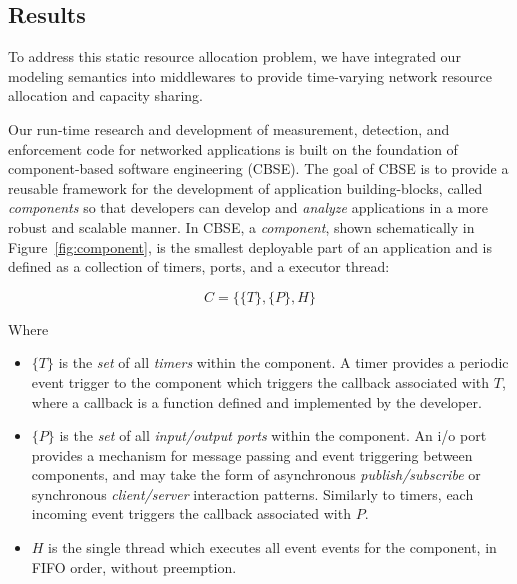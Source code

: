 \subsection{Results}
To address this static resource allocation problem, we have integrated
our modeling semantics into middlewares to provide time-varying
network resource allocation and capacity sharing.

Our run-time research and development of measurement, detection, and
enforcement code for networked applications is built on the foundation
of component-based software engineering (CBSE).  The goal of CBSE is
to provide a reusable framework for the development of application
building-blocks, called \emph{components} so that developers can develop
and \emph{analyze} applications in a more robust and scalable manner.  In
CBSE, a \emph{component}, shown schematically in
Figure~\ref{fig:component}, is the smallest deployable part of an
application and is defined as a collection of timers, ports, and a
executor thread:

\begin{equation}
  C = \{\{T\},\{P\},H\}
\end{equation}

Where

\begin{itemize}
\item $\{T\}$ is the \emph{set} of all \emph{timers} within the component.  A
  timer provides a periodic event trigger to the component which
  triggers the callback associated with $T$, where a callback is a
  function defined and implemented by the developer.  
\item $\{P\}$ is the \emph{set} of all \emph{input/output ports} within the
  component.  An i/o port provides a mechanism for message passing and
  event triggering between components, and may take the form of
  asynchronous \emph{publish/subscribe} or synchronous \emph{client/server}
  interaction patterns.  Similarly to timers, each incoming event
  triggers the callback associated with $P$.
\item $H$ is the single thread which executes all event events for
  the component, in FIFO order, without preemption.  
\end{itemize}

